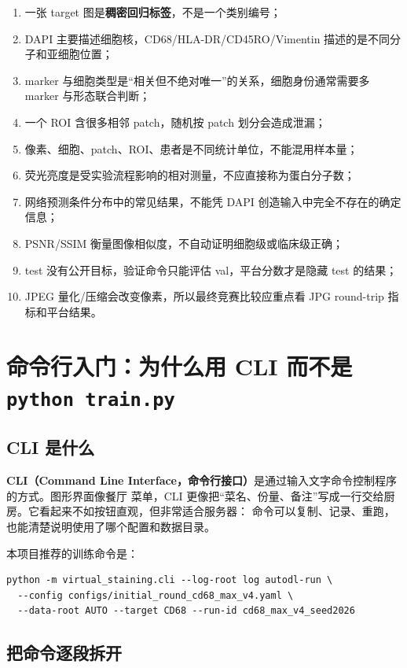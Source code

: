 \documentclass[12pt,a4paper,UTF8]{ctexart}
\newcommand{\term}[2]{\textbf{#1（#2）}}
\begin{document}
\begin{enumerate}
  \item 一张 target 图是\textbf{稠密回归标签}，不是一个类别编号；
  \item DAPI 主要描述细胞核，CD68/HLA-DR/CD45RO/Vimentin 描述的是不同分子和亚细胞位置；
  \item marker 与细胞类型是“相关但不绝对唯一”的关系，细胞身份通常需要多 marker 与形态联合判断；
  \item 一个 ROI 含很多相邻 patch，随机按 patch 划分会造成泄漏；
  \item 像素、细胞、patch、ROI、患者是不同统计单位，不能混用样本量；
  \item 荧光亮度是受实验流程影响的相对测量，不应直接称为蛋白分子数；
  \item 网络预测条件分布中的常见结果，不能凭 DAPI 创造输入中完全不存在的确定信息；
  \item PSNR/SSIM 衡量图像相似度，不自动证明细胞级或临床级正确；
  \item test 没有公开目标，验证命令只能评估 val，平台分数才是隐藏 test 的结果；
  \item JPEG 量化/压缩会改变像素，所以最终竞赛比较应重点看 JPG round-trip 指标和平台结果。
\end{enumerate}

\section{命令行入门：为什么用 CLI 而不是 \texttt{python train.py}}

\subsection{CLI 是什么}

\term{CLI}{Command Line Interface，命令行接口}是通过输入文字命令控制程序的方式。图形界面像餐厅
菜单，CLI 更像把“菜名、份量、备注”写成一行交给厨房。它看起来不如按钮直观，但非常适合服务器：
命令可以复制、记录、重跑，也能清楚说明使用了哪个配置和数据目录。

本项目推荐的训练命令是：

\begin{lstlisting}[style=shell]
python -m virtual_staining.cli --log-root log autodl-run \
  --config configs/initial_round_cd68_max_v4.yaml \
  --data-root AUTO --target CD68 --run-id cd68_max_v4_seed2026
\end{lstlisting}

\subsection{把命令逐段拆开}
\end{document}
